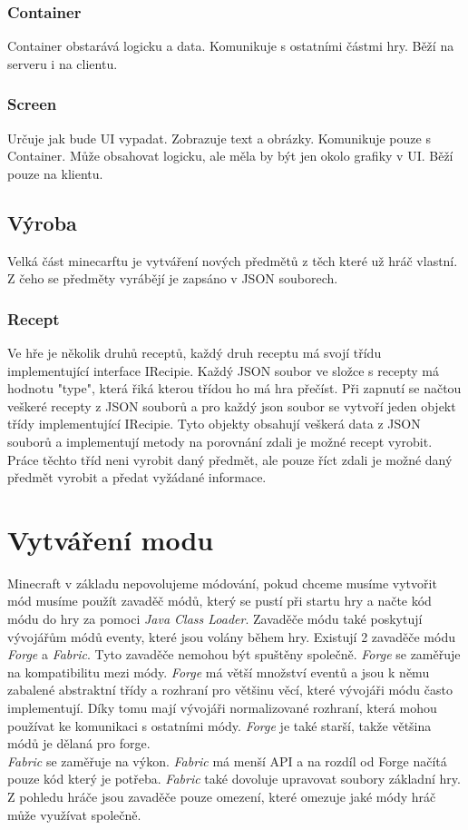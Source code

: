 \documentclass[FM,RP]{tulthesis}
\begin{document}
\subsection{Container}
Container obstarává logicku a data. Komunikuje s ostatními částmi hry. Běží na serveru i na  clientu.
\subsection{Screen}
Určuje jak bude UI vypadat. Zobrazuje text a obrázky. Komunikuje pouze s Container. Může obsahovat logicku, ale měla by být jen okolo grafiky v UI. Běží pouze na klientu.
\section{Výroba}
Velká část minecarftu je vytváření nových předmětů z těch které už hráč vlastní. Z čeho se předměty vyrábějí je zapsáno v JSON souborech. 
\subsection{Recept}
Ve hře je několik druhů receptů, každý druh receptu má svojí třídu implementující interface IRecipie. Každý JSON soubor ve složce s recepty má hodnotu "type", která řiká kterou třídou ho má hra přečíst. Při zapnutí se načtou veškeré recepty z JSON souborů a pro každý json soubor se vytvoří jeden objekt třídy implementující IRecipie. Tyto objekty obsahují veškerá data z JSON souborů a implementují metody na porovnání zdali je možné recept vyrobit. Práce těchto tříd neni vyrobit daný předmět, ale pouze říct zdali je možné daný předmět vyrobit a předat vyžádané informace.    
\chapter{Vytváření modu}
Minecraft v základu nepovolujeme módování, pokud chceme musíme vytvořit mód musíme použít zavaděč módů, který se pustí při startu hry a načte kód módu do hry za pomoci \textit{Java Class Loader}. Zavaděče módu také poskytují vývojářům módů eventy, které jsou volány během hry. Existují 2 zavaděče módu \textit{Forge} a \textit{Fabric}. Tyto zavaděče nemohou být spuštěny společně.
\textit{Forge} se zaměřuje na kompatibilitu mezi módy. \textit{Forge} má větší množství eventů a jsou k němu zabalené abstraktní třídy a rozhraní pro většinu věcí, které vývojáři módu často implementují. Díky tomu mají vývojáři normalizované rozhraní, která mohou používat ke komunikaci s ostatními módy. \textit{Forge} je také starší, takže většina módů je dělaná pro forge.\\
\textit{Fabric} se zaměřuje na výkon. \textit{Fabric} má menší API a na rozdíl od Forge načítá pouze kód který je potřeba. \textit{Fabric} také dovoluje upravovat soubory základní hry.\\
Z pohledu hráče jsou zavaděče pouze omezení, které omezuje jaké módy hráč může využívat společně.
\end{document}
